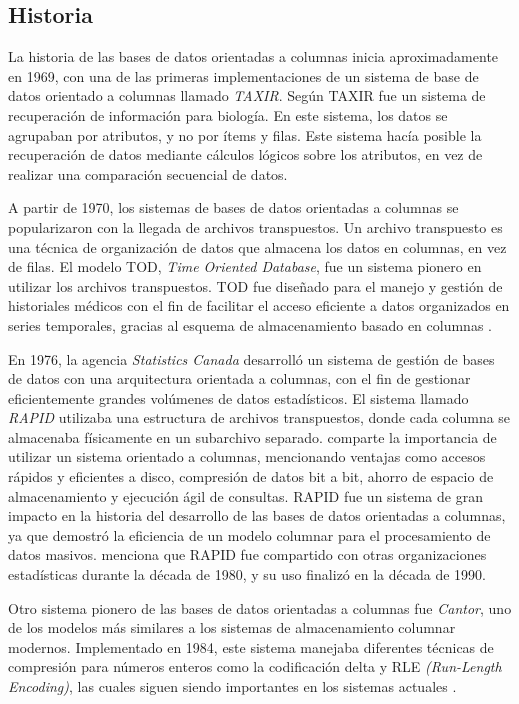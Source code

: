 \subsection{Historia}
 La historia de las bases de datos orientadas a columnas inicia aproximadamente en 1969, con una de las primeras implementaciones de un sistema de base de datos orientado a columnas llamado \textit{TAXIR}. Según \textcite{taxir1969} TAXIR fue un sistema de recuperación de información para biología. En este sistema, los datos se agrupaban por atributos, y no por ítems y filas. Este sistema hacía posible la recuperación de datos mediante cálculos lógicos sobre los atributos, en vez de realizar una comparación secuencial de datos.

 A partir de 1970, los sistemas de bases de datos orientadas a columnas se popularizaron con la llegada de archivos transpuestos. Un archivo transpuesto es una técnica de organización de datos que almacena los datos en columnas, en vez de filas. El modelo TOD, \textit{Time Oriented Database}, fue un sistema pionero en utilizar los archivos transpuestos. TOD fue diseñado para el manejo y gestión de historiales médicos con el fin de facilitar el acceso eficiente a datos organizados en series temporales, gracias al esquema de almacenamiento basado en columnas \parencite{abadi2013}.

 En 1976, la agencia \textit{Statistics Canada} desarrolló un sistema de gestión de bases de datos con una arquitectura orientada a columnas, con el fin de gestionar eficientemente grandes volúmenes de datos estadísticos. El sistema llamado \textit{RAPID} utilizaba una estructura de archivos transpuestos, donde cada columna se almacenaba físicamente en un subarchivo separado. \textcite{turner1979} comparte la importancia de utilizar un sistema orientado a columnas, mencionando ventajas como accesos rápidos y eficientes a disco, compresión de datos bit a bit, ahorro de espacio de almacenamiento y ejecución ágil de consultas. RAPID fue un sistema de gran impacto en la historia del desarrollo de las bases de datos orientadas a columnas, ya que demostró la eficiencia de un modelo columnar para el procesamiento de datos masivos. \textcite{kanungo2017} menciona que RAPID fue compartido con otras organizaciones estadísticas durante la década de  1980, y su uso finalizó en la década de 1990.

 Otro sistema pionero de las bases de datos orientadas a columnas fue \textit{Cantor}, uno de los modelos más similares a los sistemas de almacenamiento columnar modernos. Implementado en 1984, este sistema manejaba diferentes técnicas de compresión para números enteros como la codificación delta y RLE \textit{(Run-Length Encoding)}, las cuales siguen siendo importantes en los sistemas actuales \parencite{abadi2013}.

